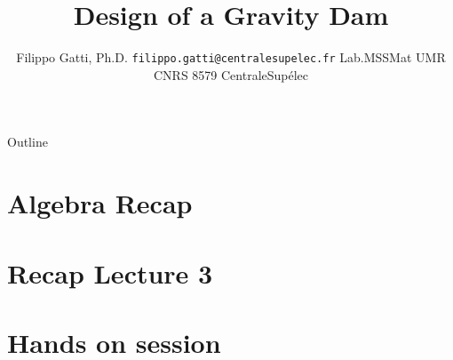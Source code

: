 \documentclass[usenames,dvipsnames]{beamer}
\title[CentraleSupélec]{Design of a Gravity Dam}
\author[Filippo Gatti]{
  Filippo Gatti, Ph.D.
  \pdfnewline
  \texttt{filippo.gatti@centralesupelec.fr}
  \pdfnewline  Lab.MSSMat UMR CNRS 8579
  \pdfnewline CentraleSupélec
}
\institute{Continuum Mechanics}
\newcommand{\writeup}{.}
\newcommand{\presentations}{\writeup}
\newcommand{\runfolder}{\presentations}
\newcommand{\runsections}{\runfolder/sections}
\begin{document}
\begin{frame}
\titlepage
\end{frame}

\begin{frame}{Outline}
\tableofcontents
\end{frame}

\section{Algebra Recap}


\section{Recap Lecture 3}


\section{Hands on session}



%
%
%
%
%
%
%
\end{document}
